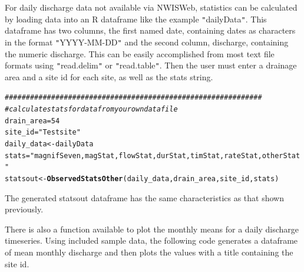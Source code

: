 \documentclass[a4paper,11pt]{article}\usepackage[]{graphicx}\usepackage[]{color}
\makeatletter
\newcommand{\hlnum}[1]{\textcolor[rgb]{0.686,0.059,0.569}{#1}}%
\newcommand{\hlstr}[1]{\textcolor[rgb]{0.192,0.494,0.8}{#1}}%
\newcommand{\hlcom}[1]{\textcolor[rgb]{0.678,0.584,0.686}{\textit{#1}}}%
\newcommand{\hlstd}[1]{\textcolor[rgb]{0.345,0.345,0.345}{#1}}%
\newcommand{\hlkwb}[1]{\textcolor[rgb]{0.69,0.353,0.396}{#1}}%
\newcommand{\hlkwd}[1]{\textcolor[rgb]{0.737,0.353,0.396}{\textbf{#1}}}%
\newenvironment{kframe}{%
 \def\at@end@of@kframe{}%
 \ifinner\ifhmode%
  \def\at@end@of@kframe{\end{minipage}}%
  \begin{minipage}{\columnwidth}%
 \fi\fi%
 \def\FrameCommand##1{\hskip\@totalleftmargin \hskip-\fboxsep
 \colorbox{shadecolor}{##1}\hskip-\fboxsep
     \hskip-\linewidth \hskip-\@totalleftmargin \hskip\columnwidth}%
 \MakeFramed {\advance\hsize-\width
   \@totalleftmargin\z@ \linewidth\hsize
   \@setminipage}}%
 {\par\unskip\endMakeFramed%
 \at@end@of@kframe}
\newenvironment{knitrout}{}{} %
\makeatother
\begin{document}
For daily discharge data not available via NWISWeb, statistics can be calculated by loading data into an R dataframe like the example \texttt{"}dailyData\texttt{"}. This dataframe has two columns, the first named date, containing dates as characters in the format \texttt{"}YYYY-MM-DD\texttt{"} and the second column, discharge, containing the numeric discharge. This can be easily accomplished from most text file formats using \texttt{"}read.delim\texttt{"} or \texttt{"}read.table\texttt{"}. Then the user must enter a drainage area and a site id for each site, as well as the stats string.

\begin{knitrout}
\color{fgcolor}\begin{kframe}
\begin{alltt}
\hlcom{#############################################################}
\hlcom{# calculate stats for data from your own data file}
\hlstd{drain_area}\hlkwb{=}\hlnum{54}
\hlstd{site_id}\hlkwb{=}\hlstr{"Test site"}
\hlstd{daily_data}\hlkwb{<-}\hlstd{dailyData}
\hlstd{stats}\hlkwb{=}\hlstr{"magnifSeven,magStat,flowStat,durStat,timStat,rateStat,otherStat"}
\hlstd{statsout} \hlkwb{<-} \hlkwd{ObservedStatsOther}\hlstd{(daily_data,drain_area,site_id,stats)}
\end{alltt}
\end{kframe}
\end{knitrout}


The generated statsout dataframe has the same characteristics as that shown previously. 

There is also a function available to plot the monthly means for a daily discharge timeseries. Using included sample data, the following code generates a dataframe of mean monthly discharge and then plots the values with a title containing the site id. 
\end{document}
